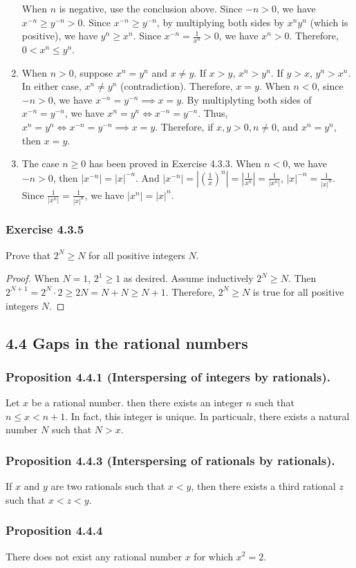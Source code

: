 \documentclass[12pt, letter]{article}
\newcommand{\ssc}{\subsubsection* }
\newcommand{\E}{Exercise }
\begin{document}
\begin{enumerate}[label=(\alph*)]
    When $n$ is negative, use the conclusion above. Since $-n>0$, we have $x^{-n}\geq y^{-n}>0$. Since $x^{-n}\geq y^{-n}$, by multiplying both sides by $x^n y^n$ (which is positive), we have 
    $y^n\geq x^n$. Since $x^{-n}=\frac{1}{x^n}>0$, we have $x^n>0$. Therefore, $0<x^n\leq y^n$.
    \item When $n>0$, suppose $x^n=y^n$ and $x\ne y$. If $x>y$, $x^n>y^n$. If $y>x$, $y^n>x^n$. In either case, $x^n\ne y^n$ (contradiction). Therefore, $x=y$. When $n<0$, 
    since $-n>0$, we have $x^{-n}=y^{-n}\implies x=y$. By multiplyting both sides of $x^{-n}=y^{-n}$, we have $x^n=y^n\iff x^{-n}=y^{-n}$. Thus, $x^n=y^n\iff x^{-n}=y^{-n}\implies x=y$.
    Therefore, if $x,y>0,n\ne 0$, and $x^n=y^n$, then $x=y$.
    \item The case $n\geq 0$ has been proved in Exercise 4.3.3. When $n<0$, we have $-n>0$, then $|x^{-n}|=|x|^{-n}$. And $|x^{-n}|=|(\frac{1}{x})^n|=|\frac{1}{x^n}|=\frac{1}{|x^n|}$,
    $|x|^{-n}=\frac{1}{|x|^n}$. Since $\frac{1}{|x^n|}=\frac{1}{|x|^n}$, we have $|x^n|=|x|^n$. 
\end{enumerate}
\ssc{\E 4.3.5}
Prove that $2^N\geq N$ for all positive integers $N$.
\begin{proof}
    When $N=1$, $2^1\geq 1$ as desired. Assume inductively $2^N\geq N$. Then $2^{N+1}=2^N\cdot 2\geq 2N=N+N\geq N+1$. Therefore, $2^N\geq N$ is true for all positive integers $N$.
\end{proof}
\subsection*{4.4 Gaps in the rational numbers}
\subsubsection*{Proposition 4.4.1 (Interspersing of integers by rationals).}
Let $x$ be a rational number. then there exists an integer $n$ such that $n\leq x<n+1$. In fact, this integer is unique. In particualr, there exists a natural number $N$ such that 
$N>x$.
\subsubsection*{Proposition 4.4.3 (Interspersing of rationals by rationals).}
If $x$ and $y$ are two rationals such that $x<y$, then there exists a third rational $z$ such that $x<z<y$.
\subsubsection*{Proposition 4.4.4}
There does not exist any rational number $x$ for which $x^2=2$.
\end{document}
